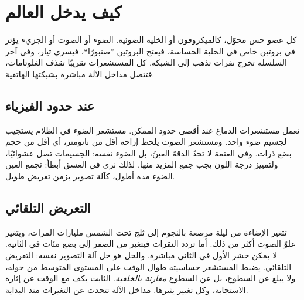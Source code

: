 \chapter{كيف يدخل العالم}

كل عضو حس محوّل، كالميكروفون أو الخلية الضوئية. الضوء أو الصوت أو الجزيء يؤثر في بروتين خاص في الخلية الحساسة، فيفتح البروتين ”صنبورًا“، فيسري تيار، وفي آخر السلسلة تخرج نقرات تذهب إلى الشبكة. كل المستشعرات تقريبًا تقذف الغلوتامات، فتتصل مداخل الآلة مباشرة بشبكتها الهاتفية.

\section*{عند حدود الفيزياء}

تعمل مستشعرات الدماغ عند أقصى حدود الممكن. مستشعر الضوء في الظلام يستجيب لجسيم ضوء واحد. ومستشعر الصوت يلحظ إزاحة أقل من نانومتر، أي أقل من حجم بضع ذرات. وفي العتمة لا تحدّ الدقةَ العينُ، بل الضوء نفسه: الجسيمات تصل عشوائيًا، ولتمييز درجة اللون يجب جمع المزيد منها. لذلك نرى في الغسق أبطأ: تجمع العين الضوء مدة أطول، كآلة تصوير بزمن تعريض طويل.

\section*{التعريض التلقائي}

تتغير الإضاءة من ليلة مرصعة بالنجوم إلى ثلج تحت الشمس مليارات المرات، ويتغير علوّ الصوت أكثر من ذلك. أما تردد النقرات فيتغير من الصفر إلى بضع مئات في الثانية. لا يمكن حشر الأول في الثاني مباشرة. والحل هو حل آلة التصوير نفسه: التعريض التلقائي. يضبط المستشعر حساسيته طوال الوقت على المستوى المتوسط من حوله، ولا يبلغ عن السطوع، بل عن السطوع \emph{مقارنة بالخلفية}. الثابت يكف مع الوقت عن إثارة الاستجابة، وكل تغيير يثيرها. مداخل الآلة تتحدث عن التغيرات منذ البداية.

